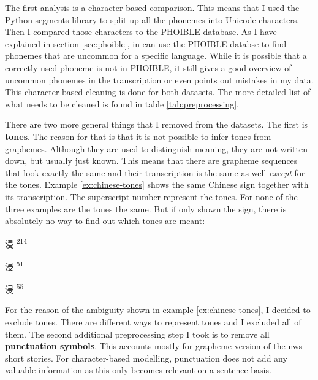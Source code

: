 The first analysis is a character based comparison. This means that I used the Python segments library to split up all the phonemes into Unicode characters. Then I compared those characters to the PHOIBLE database. As I have explained in section \ref{sec:phoible}, in can use the PHOIBLE databse to find phonemes that are uncommon for a specific language. While it is possible that a correctly used phoneme is not in PHOIBLE, it still gives a good overview of uncommon phonemes in the transcription or even points out mistakes in my data. This character based cleaning is done for both datasets. The more detailed list of what needs to be cleaned is found in table \ref{tab:preprocessing}.

There are two more general things that I removed from the datasets. The first is \textbf{tones}. The reason for that is that it is not possible to infer tones from graphemes. Although they are used to distinguish meaning, they are not written down, but usually just known. This means that there are grapheme sequences that look exactly the same and their transcription is the same as well \textit{except} for the tones. Example \ref{ex:chinese-tones} shows the same Chinese sign together with its transcription. The superscript number represent the tones. For none of the three examples are the tones the same. But if only shown the sign, there is absolutely no way to find out which tones are meant:

\begin{covsubexamples}
\label{ex:chinese-tones}
\item 
\begin{CJK*}{UTF8}{bsmi}
浸 \>\>\>\> \textsuperscript{2}\textsuperscript{1}\textsuperscript{4}
\end{CJK*}
\item 
\begin{CJK*}{UTF8}{bsmi}
浸 \>\>\>\> \textsuperscript{5}\textsuperscript{1}
\end{CJK*}
\item  
\begin{CJK*}{UTF8}{bsmi}
浸 \>\>\>\> \textsuperscript{5}\textsuperscript{5}
\end{CJK*}
\end{covsubexamples}

For the reason of the ambiguity shown in example \ref{ex:chinese-tones}, I decided to exclude tones. There are different ways to represent tones and I excluded all of them. The second additional preprocessing step I took is to remove all \textbf{punctuation symbols}. This accounts mostly for grapheme version of the \ac{nws} short stories. For character-based modelling, punctuation does not add any valuable information as this only becomes relevant on a sentence basis. 

